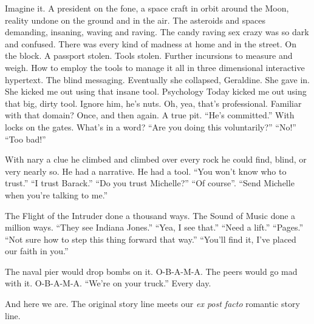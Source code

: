 

Imagine it.  A president on the fone, a space craft in orbit around
the Moon, reality undone on the ground and in the air.  The asteroids
and spaces demanding, insaning, waving and raving.  The candy raving
sex crazy was so dark and confused.  There was every kind of madness
at home and in the street.  On the block.  A passport stolen.  Tools
stolen.  Further incursions to measure and weigh.  How to employ the
tools to manage it all in three dimensional interactive hypertext.
The blind messaging.  Eventually she collapsed, Geraldine.  She gave
in.  She kicked me out using that insane tool.  Psychology Today
kicked me out using that big, dirty tool.  Ignore him, he's nuts.  Oh,
yea, that's professional.  Familiar with that domain?  Once, and then
again.  A true pit.  ``He's committed.''  With locks on the gates.
What's in a word?  ``Are you doing this voluntarily?''  ``No!''  ``Too
bad!''

With nary a clue he climbed and climbed over every rock he could find,
blind, or very nearly so.  He had a narrative.  He had a tool.  ``You
won't know who to trust.''  ``I trust Barack.''  ``Do you trust
Michelle?''  ``Of course''.  ``Send Michelle when you're talking to
me.''

The Flight of the Intruder done a thousand ways.  The Sound of Music
done a million ways.  ``They see Indiana Jones.''  ``Yea, I see
that.''  ``Need a lift.''  ``Pages.''  ``Not sure how to step this
thing forward that way.''  ``You'll find it, I've placed our faith in
you.''

The naval pier would drop bombs on it.  O-B-A-M-A.  The peers would go
mad with it.  O-B-A-M-A.  ``We're on your truck.''  Every day.

And here we are.  The original story line meets our {\it ex post
facto} romantic story line.

\bye
